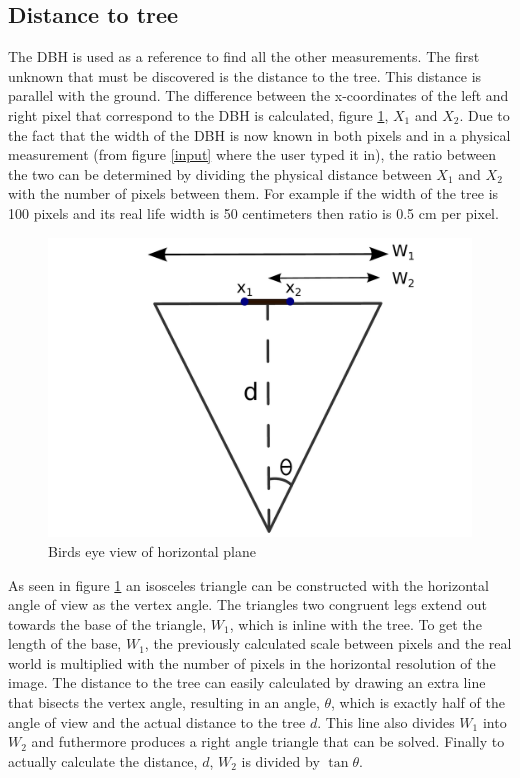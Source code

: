 \subsection{Distance to tree}
The DBH is used as a reference to find all the other measurements. The first unknown that must be discovered is the distance to the tree. This distance is parallel with the ground. The difference between the x-coordinates of the left and right pixel that correspond to the DBH is calculated, figure \ref{horizontal_triangle}, $X_1$ and $X_2$. Due to the fact that the width of the DBH is now known in both pixels and in a physical measurement (from figure \ref{input} where the user typed it in), the ratio between the two can be determined by dividing the physical distance between $X_1$ and $X_2$ with the number of pixels between them. For example if the width of the tree is 100 pixels and its real life width is 50 centimeters then ratio is 0.5 cm per pixel.
\begin{figure}[htp]
\centering
{
	\includegraphics[scale=0.3]{horizontal_triangle.pdf}
	\caption{Birds eye view of horizontal plane}
	\label{horizontal_triangle}
}
\end{figure}
 As seen in figure \ref{horizontal_triangle} an isosceles triangle can be constructed with the horizontal angle of view as the vertex angle. The triangles two congruent legs extend out towards the base of the triangle, $W_1$, which is inline with the tree. To get the length of the base, $W_1$, the previously calculated scale between pixels and the real world is multiplied with the number of pixels in the horizontal resolution of the image. The distance to the tree can easily calculated by drawing an extra line that bisects the vertex angle, resulting in an angle, $\theta$, which is exactly half of the angle of view and the actual distance to the tree $d$. This line also divides $W_1$ into $W_2$ and futhermore produces a right angle triangle that can be solved. Finally to actually calculate the distance, $d$, $W_2$ is divided by $\tan{\theta}$.


